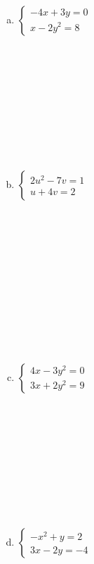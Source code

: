\documentclass[a4paper,14pt]{article}
\begin{document}
\begin{multicols}{2}
\begin{enumerate}
\begin{enumerate}[a)]
	    	    \item $\begin{cases}
	    	    	-4x + 3y = 0 \\
	    	    	x - 2y^2 = 8
	    	    \end{cases}$ \\\\\\\\\\\\\\\\\\\\
    	        \item $\begin{cases}
    	        	2u^2 - 7v = 1 \\
    	        	u + 4v = 2
    	        \end{cases}$ \\\\\\\\\\\\\\\\\\\\\\\\
                \item $\begin{cases}
                	4x - 3y^2 = 0 \\
                	3x + 2y^2 = 9
                \end{cases}$ \\\\\\\\\\\\\\\\\\\\
                \item $\begin{cases}
                	-x^2 + y = 2 \\
                	3x - 2y = -4
                \end{cases}$ \\\\\\\\\\\\\\\\\\\\

\end{enumerate}
\end{enumerate}
\end{multicols}
\end{document}
